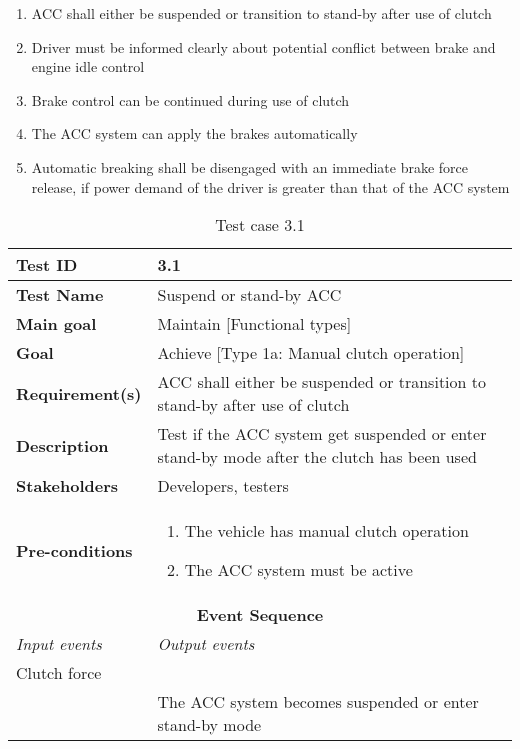 \begin{enumerate}
    \item ACC shall either be suspended or transition to stand-by after use of clutch
    \item Driver must be informed clearly about potential conflict between brake and engine idle control
    \item Brake control can be continued during use of clutch
    \item The ACC system can apply the brakes automatically
    \item Automatic breaking shall be disengaged with an immediate brake force release, if power demand of the driver is greater than that of the ACC system
\end{enumerate}

\begin{table}[H]
\centering
\begin{tabularx}{\linewidth}{X|X}
  \hline
  \textbf{Test ID} & 3.1\\
  \hline
  \textbf{Test Name} &  Suspend or stand-by ACC\\
  \hline
  \textbf{Main goal} & Maintain [Functional types] \\
  \hline
  \textbf{Goal} & Achieve [Type 1a: Manual clutch operation] \\
  \hline
  \textbf{Requirement(s)} &  ACC shall either be suspended or transition to stand-by after use of clutch\\
  \hline
  \textbf{Description} &  Test if the ACC system get suspended or enter stand-by mode after the clutch has been used\\
  \hline
  \textbf{Stakeholders} &  Developers, testers\\
  \hline
  \textbf{Pre-conditions} &  
  \begin{enumerate}
      \item The vehicle has manual clutch operation
      \item The ACC system must be active
  \end{enumerate}\\
  \hline
  \multicolumn{2}{c}{\textbf{Event Sequence}} \\
  \hline
  \textit{Input events} & \textit{Output events} \\
  \hline
   Clutch force &  \\
  \hline
    & The ACC system becomes suspended or enter stand-by mode \\
  \hline
  \end{tabularx}
\caption{\label{tab_caseX} Test case 3.1}
\end{table}

